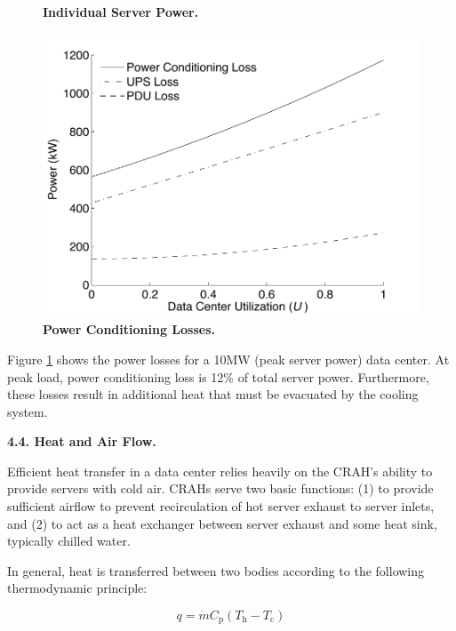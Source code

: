 \begin{figure}[ht]
\begin{minipage}[b]{0.5\linewidth}
  \caption{\textbf{ Individual Server Power. } }
  \label{figure::Spec}
\end{minipage}
\begin{minipage}[b]{0.5\linewidth}
\centering
  \includegraphics[width = \linewidth]{Appendices/WEED/figure/PowerConditioning.pdf}
\caption{\textbf{ Power Conditioning Losses. }}
  \label{figure::PowerConditioning}
\end{minipage}

\end{figure}

Figure \ref{figure::PowerConditioning} shows the power losses for a 10MW (peak server power) data center.
At peak load, power conditioning loss is 12\% of total server power.  Furthermore, these losses result in additional heat that must be evacuated by the cooling system.

{\bf 4.4. Heat and Air Flow.} 

Efficient heat transfer in a data center relies heavily on the CRAH's ability to provide servers with cold air.  
CRAHs serve two basic functions: (1) to provide sufficient airflow to prevent recirculation of hot server exhaust to server inlets, and (2) to act as a heat exchanger between server exhaust and some heat sink, typically chilled water.

In general, heat is transferred between two bodies according to the following thermodynamic principle:

\begin{equation}
q = \dot{m} C_{\mathrm{p}} ( T_{\mathrm{h}} - T_{\mathrm{c}})
\end{equation}

